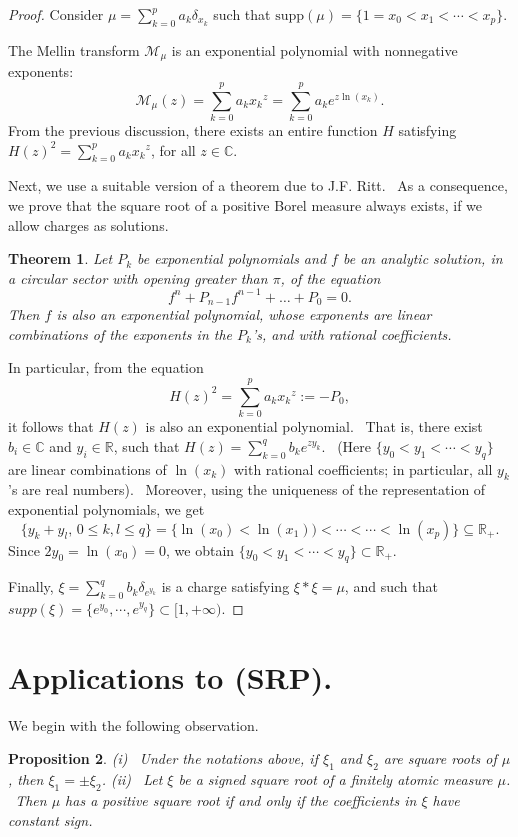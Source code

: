 \documentclass[12pt]{amsart}
\newtheorem{thm}{Theorem}[section]
\newtheorem{prop}[thm]{Proposition}
\newcommand{\C}{\mathbb{C}}
\begin{document}
\begin{proof}
Consider $\mu=\sum_{k=0}^p a_k\delta_{x_k}$ such that  $\textrm{supp}(\mu)= \{1=x_0<x_1<\cdots <x_p \}$.

The Mellin transform $\mathcal{M}_\mu$ is an exponential polynomial with nonnegative exponents:
$$
\mathcal{M}_{\mu}(z)=\sum_{k=0}^p a_k{x_k}^z=\sum_{k=0}^p a_k e^{z\ln(x_k)}.
$$
From the previous  discussion,  there exists an entire function $H$ satisfying $H(z)^2= \sum_{k=0}^p a_k{x_k}^z$, for all $z\in\C$.

Next, we use a suitable version of a theorem due to J.F. Ritt. \ As a consequence, we prove that the square root of a positive Borel measure always exists, if we allow charges as solutions.

\begin{thm}\cite[Theorem I]{Ritt}\label{rittt}
    Let $P_k$ be exponential polynomials and  $f$ be an analytic solution, in a circular sector with opening greater than $\pi$, of the equation 
    $$
    f^n+P_{n-1}f^{n-1}+\dots+P_0=0.
    $$
    Then $f$ is also an exponential polynomial, whose exponents are linear combinations of the exponents in the $P_k$'s, and with rational coefficients.
\end{thm}

In particular, from the equation $$
H(z)^2= \sum_{k=0}^p a_k{x_k}^z :=-P_0,
$$
it follows that $H(z)$  is also an exponential polynomial. \ That is, there exist $b_i\in \mathbb{C}$ and $y_i\in \mathbb{R}$, such that $H(z)=\sum_{k=0}^q b_k e^{zy_k}$. \ (Here $\{ y_0<y_1< \cdots < y_q\} $ are  linear combinations of $\ln(x_k)$ with rational coefficients; in particular, all $y_k$'s are real numbers). \  Moreover, using the uniqueness of the representation of exponential polynomials, we get 
$$
\{y_k+y_l, \, 0\le k, l\le q \}= \{\ln(x_0)<\ln(x_1))<\cdots <\cdots<\ln(x_p) \} \subseteq {\mathbb R}_+.
$$
Since   $2y_0= \ln(x_0)= 0$, we obtain  $\{ y_0<y_1< \cdots < y_q\} \subset {\mathbb R}_+.$ 

Finally, $\xi= \sum_{k=0}^q b_k \delta_{e^{y_k}}$ is a charge satisfying $\xi*\xi=\mu$, and such that  $supp(\xi) =\{e^{y_0}, \cdots,e^{y_q} \}\subset [1,+\infty)$.

\end{proof}

\section{Applications to {\bf (SRP)}.}
We begin with the following observation.
\begin{prop}
(i) \ Under the notations above, if $\xi_1$ and $\xi_2$ are  square roots of $\mu$, then $\xi_1 = \pm \xi_2$. \newline
(ii) \ Let $\xi$ be a signed square root of a finitely atomic measure $\mu$. \ Then $\mu$ has a positive square root if and only if the coefficients in $\xi$ have constant sign.
\end{prop}
\end{document}
